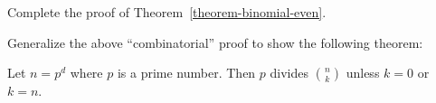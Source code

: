 
\begin{exercise}
  Complete the proof of Theorem~\ref{theorem-binomial-even}.
\end{exercise}



\begin{exerciseD}
  Generalize the above ``combinatorial'' proof to show the following theorem:
  \begin{theorem}
 Let $n = p^d$ where $p$ is a prime number. Then $p$ divides
 ${n \choose k}$ unless $k=0$ or $k=n$. 
 \end{theorem}
\end{exerciseD}

